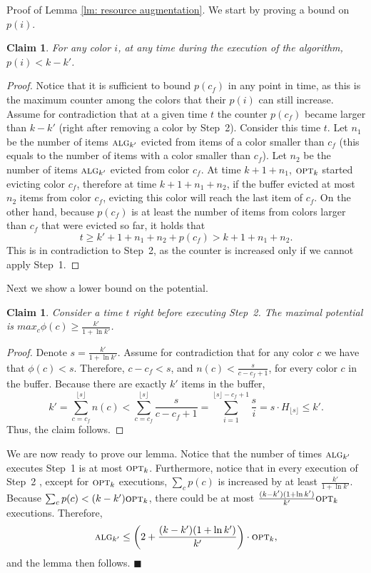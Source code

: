 \documentclass[12pt]{article}
\newtheorem{claim}[theorem]{Claim}
\newenvironment{proofof}[1]{ {\sc Proof of #1.}\/}{\qedsymbol}
\renewcommand{\qedsymbol}{\ensuremath{\blacksquare}}
\newcommand{\opt}{{\hbox{\sc opt}}}
\newcommand{\alg}{{\hbox{\sc alg}}}
\begin{document}
\begin{proofof}{Lemma \ref{lm: resource augmentation}}
We start by proving a bound on $p(i)$.
\begin{claim}
For any color $i$, at any time during the execution of the algorithm, 
$p(i)<k-k'$.
\end{claim}
\begin{proof}
Notice that it is sufficient to bound $p(c_f)$ in any point in time,
as this is the maximum counter among the colors that their 
$p(i)$ can still increase.
Assume for contradiction that at a given time $t$ the counter 
$p(c_f)$ became larger than $k-k'$ (right after removing a color by Step~2). 
Consider this time $t$. Let $n_1$ be the number of items $\alg_{k'}$ evicted from 
items of a color smaller than $c_f$ (this equals to the number of items with
 a color smaller than $c_f$). Let $n_2$ be the 
number of items $\alg_{k'}$ evicted from color $c_f$.
At time $k+1+n_1$, $\opt_k$ started evicting color $c_f$,
therefore at time $k+1+n_1+n_2$, if the buffer evicted at
most $n_2$ items from color $c_f$, evicting this color will reach 
the last item of $c_f$.
On the other hand, 
because $p(c_f)$ is at least the number of items from colors larger than
$c_f$ that were evicted so far,
it holds that 
$$
t \ge k'+1+n_1+n_2+p(c_f)> k+1+n_1+n_2.
$$
This is in contradiction to Step~2, as the counter is increased only if 
we cannot apply Step~1.
\end{proof}

Next we show a lower bound on the potential.
\begin{claim}
Consider a time $t$ right before executing Step~2.
The maximal potential is $max_c \phi (c)\ge \frac{k'}{1+\ln k'}$.
\end{claim}
\begin{proof}
Denote $s=\frac{k'}{1+\ln k'}$.
Assume for contradiction that for any color $c$ we have that 
$\phi (c)<s$. Therefore, $c-c_f<s$, and $n(c) < \frac{s}{c-c_f +1}$, 
for every color $c$ in the buffer.
Because there are exactly $k'$ items in the buffer, 
$$
k'=\sum_{c=c_f}^{\lfloor s\rfloor} n(c) < \sum_{c=c_f}^{\lfloor s\rfloor} \frac{s}{c-c_f +1} =
\sum_{i=1}^{\lfloor s\rfloor-c_f+1} \frac {s}{i} = s\cdot H_{\lfloor s\rfloor}\le k'.
$$
Thus, the claim follows.
\end{proof}

We are now ready to prove our lemma.
Notice that the number of times $\alg_{k'}$ executes Step~1
is at most $\opt_k$. Furthermore, notice that 
in every execution of Step~2 , except for $\opt_k$ executions, $\sum_c p(c)$  is increased 
by at least $\frac{k'}{1+\ln k'}$.
Because $\sum_c p(c)<(k-k') \opt_k$, there could be at most 
$\frac{(k-k')(1+\ln k')}{k'} \opt_k$ executions.
Therefore, 
$$
\alg_{k'} \le \left(2+\frac{(k-k')(1+\ln k')}{k'} \right)\cdot\opt_k,
$$
and the lemma then follows.
\end{proofof}
\end{document}
